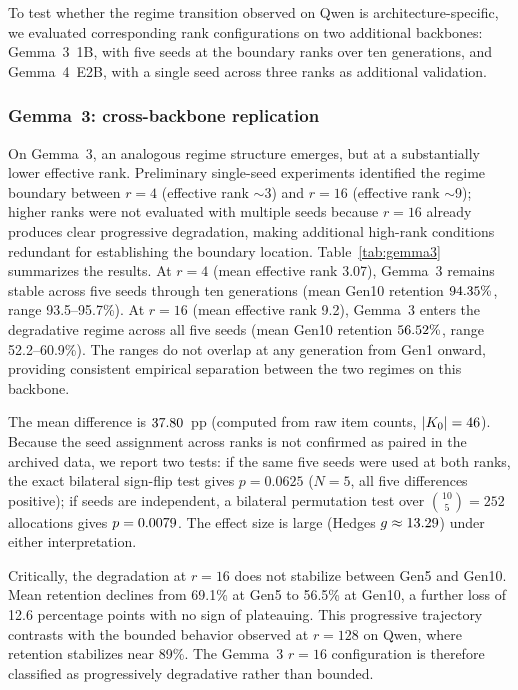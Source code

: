 \documentclass[a4paper,fleqn]{cas-dc}
\newif\ifshowchanges
\newcommand{\rev}[1]{\ifshowchanges{\color{blue}#1}\else{#1}\fi}
\begin{document}
To test whether the regime transition observed on Qwen is architecture-specific,
we evaluated corresponding rank configurations on two additional backbones:
Gemma~3~1B, with five seeds at the boundary ranks over ten generations, and
Gemma~4~E2B, with a single seed across three ranks as additional validation.

\subsubsection{Gemma~3: cross-backbone replication}

On Gemma~3, an analogous regime structure emerges, but at a substantially lower
effective rank. Preliminary single-seed experiments identified the regime
boundary between $r=4$ (effective rank ${\sim}$3) and $r=16$ (effective rank
${\sim}$9); higher ranks were not evaluated with multiple seeds because $r=16$
already produces clear progressive degradation, making additional high-rank
conditions redundant for establishing the boundary location.
Table~\ref{tab:gemma3} summarizes the results. At $r=4$ (mean
effective rank 3.07), Gemma~3 remains stable across five seeds through ten
generations (mean Gen10 retention \rev{$94.35\%$, range 93.5--95.7\%}).
At $r=16$ (mean effective rank 9.2), Gemma~3 enters the degradative regime
across all five seeds (mean Gen10 retention \rev{$56.52\%$,
range 52.2--60.9\%}). The ranges do not
overlap at any generation from Gen1 onward, providing consistent empirical
separation between the two regimes on this backbone.

\rev{The mean difference is $37.80$~pp (computed from raw item counts,
$|K_0|=46$). Because the seed assignment across ranks is not confirmed
as paired in the archived data, we report two tests: if the same five seeds were
used at both ranks, the exact bilateral sign-flip test gives $p=0.0625$
($N=5$, all five differences positive); if seeds are independent, a bilateral
permutation test over $\binom{10}{5}=252$ allocations gives
$p=0.0079$. The effect size is large (Hedges $g \approx 13.29$)
under either interpretation.}

Critically, the degradation at $r=16$ does not stabilize between Gen5 and
Gen10. Mean retention declines from 69.1\% at Gen5 to 56.5\% at Gen10, a
further loss of 12.6 percentage points with no sign of plateauing. This
progressive trajectory contrasts with the bounded behavior observed at $r=128$
on Qwen, where retention stabilizes near 89\%. The Gemma~3 $r=16$
configuration is therefore classified as progressively degradative rather than
bounded.
\end{document}

